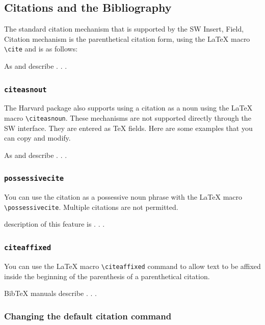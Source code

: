 \documentclass{article}
\begin{document}
\subsection{Citations and the Bibliography}

The standard citation mechanism that is supported by the SW \textsf{Insert,
Field, Citation} mechanism is the parenthetical citation form, using the
LaTeX macro \verb|\cite| and is as follows:

As \cite{agsm} and \cite[Annex~B]{latex:guide} describe . . .

\subsubsection{\texttt{\TEXTsymbol{\backslash}citeasnout}}

The Harvard package also supports using a citation as a noun using the LaTeX
macro \verb|\citeasnoun|. These mechanisms are not supported directly
through the SW interface. They are entered as TeX fields. Here are some
examples that you can copy and modify.

As  and  describe . . .

\subsubsection{\texttt{\TEXTsymbol{\backslash}possessivecite}}

You can use the citation as a possessive noun phrase with the LaTeX macro 
\verb|\possessivecite|. Multiple citations are not permitted.

 description of this feature is . . .

\subsubsection{\texttt{\TEXTsymbol{\backslash}citeaffixed}}

You can use the LaTeX macro \verb|\citeaffixed| command to allow text to be
affixed inside the beginning of the parenthesis of a parenthetical citation.

BibTeX manuals  describe . . .

\subsubsection{Changing the default citation command}
\end{document}
